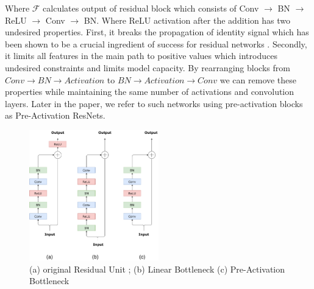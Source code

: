 Where $\mathcal{F}$ calculates output of residual block which consists of Conv $\rightarrow$ BN $\rightarrow$ ReLU $\rightarrow$ Conv $\rightarrow$ BN. Where ReLU activation after the addition has two undesired properties. First, it breaks the propagation of identity signal which has been shown to be a crucial ingredient of success for residual networks \cite{chao2019_hardnet}. Secondly, it limits all features in the main path to positive values which introduces undesired constraints and limits model capacity. By rearranging blocks from $Conv \rightarrow BN \rightarrow Activation$ to $BN \rightarrow Activation \rightarrow Conv$ we can remove these properties while maintaining the same number of activations and convolution layers. Later in the paper, we refer to such networks using pre-activation blocks as Pre-Activation ResNets.



\begin{figure}[h!]
  \centering
  \includegraphics[width=0.5\textwidth]{images/blocks.pdf}
  \caption{ (a) original Residual Unit \cite{he2016deep_resnetv1}; (b) Linear Bottleneck \cite{sandler2018_mobilenetv2} (c) Pre-Activation Bottleneck \cite{he2016identity_resnetv2}}
  \label{fig: pre-act}
\end{figure}


